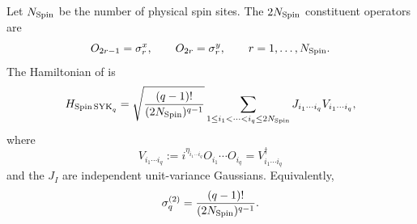 \documentclass{article}
\theoremstyle{definition}
\begin{document}
Let $N_{\rm Spin}$ be the number of physical spin sites.  The
$2N_{\rm Spin}$ constituent operators are
\begin{equation}
    O_{2r-1}=\sigma_r^x,
    \qquad
    O_{2r}=\sigma_r^y,
    \qquad
    r=1,\ldots,N_{\rm Spin}.
\end{equation}
The Hamiltonian of \cite{xu2025dynamics} is
\begin{equation}
    H_{{\rm Spin\,SYK}_q}
    =\sqrt{\frac{(q-1)!}{(2N_{\rm Spin})^{q-1}}}
    \sum_{1\le i_1<\cdots<i_q\le2N_{\rm Spin}}
    J_{i_1\cdots i_q}V_{i_1\cdots i_q},
\end{equation}
where
\begin{equation}
    V_{i_1\cdots i_q}
    :=i^{\eta_{i_1\cdots i_q}}O_{i_1}\cdots O_{i_q}
    =V_{i_1\cdots i_q}^\dagger
\end{equation}
and the $J_I$ are independent unit-variance Gaussians.  Equivalently,
\begin{equation}
    \sigma_q^{(2)}
    =\frac{(q-1)!}{(2N_{\rm Spin})^{q-1}}.
\end{equation}
\end{document}
